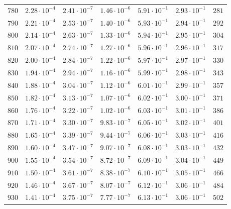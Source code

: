 \begin{table}
\begin{tabular}{ccccccc}
$780 $&$ 2.28\cdot 10^{-4}  $&$ 2.41\cdot 10^{-7}  $&$ 1.46\cdot 10^{-6}  $&$ 5.91\cdot 10^{-1}  $&$ 2.93\cdot 10^{-1}  $&$ 281 $\\
$790 $&$ 2.21\cdot 10^{-4}  $&$ 2.53\cdot 10^{-7}  $&$ 1.40\cdot 10^{-6}  $&$ 5.93\cdot 10^{-1}  $&$ 2.94\cdot 10^{-1}  $&$ 292 $\\
$800 $&$ 2.14\cdot 10^{-4}  $&$ 2.63\cdot 10^{-7}  $&$ 1.33\cdot 10^{-6}  $&$ 5.94\cdot 10^{-1}  $&$ 2.95\cdot 10^{-1}  $&$ 304 $\\
$810 $&$ 2.07\cdot 10^{-4}  $&$ 2.74\cdot 10^{-7}  $&$ 1.27\cdot 10^{-6}  $&$ 5.96\cdot 10^{-1}  $&$ 2.96\cdot 10^{-1}  $&$ 317 $\\
$820 $&$ 2.00\cdot 10^{-4}  $&$ 2.84\cdot 10^{-7}  $&$ 1.22\cdot 10^{-6}  $&$ 5.97\cdot 10^{-1}  $&$ 2.97\cdot 10^{-1}  $&$ 330 $\\
$830 $&$ 1.94\cdot 10^{-4}  $&$ 2.94\cdot 10^{-7}  $&$ 1.16\cdot 10^{-6}  $&$ 5.99\cdot 10^{-1}  $&$ 2.98\cdot 10^{-1}  $&$ 343 $\\
$840 $&$ 1.88\cdot 10^{-4}  $&$ 3.04\cdot 10^{-7}  $&$ 1.12\cdot 10^{-6}  $&$ 6.01\cdot 10^{-1}  $&$ 2.99\cdot 10^{-1}  $&$ 357 $\\
$850 $&$ 1.82\cdot 10^{-4}  $&$ 3.13\cdot 10^{-7}  $&$ 1.07\cdot 10^{-6}  $&$ 6.02\cdot 10^{-1}  $&$ 3.00\cdot 10^{-1}  $&$ 371 $\\
$860 $&$ 1.76\cdot 10^{-4}  $&$ 3.22\cdot 10^{-7}  $&$ 1.02\cdot 10^{-6}  $&$ 6.03\cdot 10^{-1}  $&$ 3.01\cdot 10^{-1}  $&$ 386 $\\
$870 $&$ 1.71\cdot 10^{-4}  $&$ 3.30\cdot 10^{-7}  $&$ 9.83\cdot 10^{-7}  $&$ 6.05\cdot 10^{-1}  $&$ 3.02\cdot 10^{-1}  $&$ 401 $\\
$880 $&$ 1.65\cdot 10^{-4}  $&$ 3.39\cdot 10^{-7}  $&$ 9.44\cdot 10^{-7}  $&$ 6.06\cdot 10^{-1}  $&$ 3.03\cdot 10^{-1}  $&$ 416 $\\
$890 $&$ 1.60\cdot 10^{-4}  $&$ 3.47\cdot 10^{-7}  $&$ 9.07\cdot 10^{-7}  $&$ 6.08\cdot 10^{-1}  $&$ 3.03\cdot 10^{-1}  $&$ 432 $\\
$900 $&$ 1.55\cdot 10^{-4}  $&$ 3.54\cdot 10^{-7}  $&$ 8.72\cdot 10^{-7}  $&$ 6.09\cdot 10^{-1}  $&$ 3.04\cdot 10^{-1}  $&$ 449 $\\
$910 $&$ 1.50\cdot 10^{-4}  $&$ 3.61\cdot 10^{-7}  $&$ 8.38\cdot 10^{-7}  $&$ 6.10\cdot 10^{-1}  $&$ 3.05\cdot 10^{-1}  $&$ 466 $\\
$920 $&$ 1.46\cdot 10^{-4}  $&$ 3.67\cdot 10^{-7}  $&$ 8.07\cdot 10^{-7}  $&$ 6.12\cdot 10^{-1}  $&$ 3.06\cdot 10^{-1}  $&$ 484 $\\
$930 $&$ 1.41\cdot 10^{-4}  $&$ 3.75\cdot 10^{-7}  $&$ 7.77\cdot 10^{-7}  $&$ 6.13\cdot 10^{-1}  $&$ 3.06\cdot 10^{-1}  $&$ 502 $\\

\end{tabular}
\end{table}
